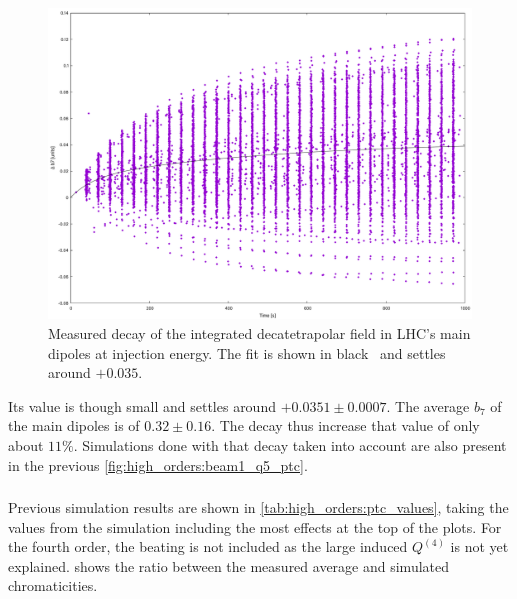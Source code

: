 \begin{figure}[!htb]
    \centering
    \includegraphics[width=0.9\columnwidth]{images/decay_b7.pdf}
    \caption{Measured decay of the integrated decatetrapolar field in LHC's main dipoles at
    injection energy. The fit is shown in black~\cite{deniau2024private} and settles around
    $+0.035$.}
    \label{fig:high_orders:b7_decay}
\end{figure}

Its value is though small and settles around $+0.0351 \pm 0.0007$. The average $b_7$ of the main
dipoles is of $0.32 \pm 0.16$. The decay thus increase that value of only about $11\%$.
Simulations done with that decay taken into account are also present in the previous
\cref{fig:high_orders:beam1_q5_ptc}.


\FloatBarrier
\subsubsection{}

Previous simulation results are shown in \cref{tab:high_orders:ptc_values}, taking the values from 
the simulation including the most effects at the top of the plots. For the fourth order, the beating
is not included as the large induced $Q^{(4)}$ is not yet explained.
 shows the ratio between the measured average and simulated
chromaticities.

